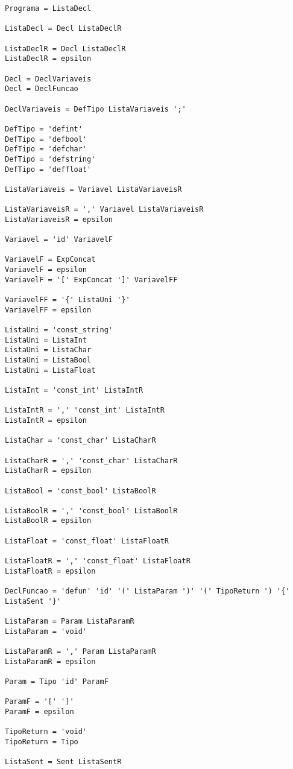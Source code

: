 \documentclass[
  12pt,				%
  oneside,			%
  a4paper,			%
  english,			%
  french,				%
  spanish,			%
  brazil,				%
]{abntex2}
\begin{document}
\begin{lstlisting}[label={code:gramatica-original},caption={Gramática
    original da linguagem de programação LisC.},style={mystyle}]
Programa = ListaDecl

ListaDecl = Decl ListaDeclR

ListaDeclR = Decl ListaDeclR
ListaDeclR = epsilon

Decl = DeclVariaveis
Decl = DeclFuncao

DeclVariaveis = DefTipo ListaVariaveis ';'

DefTipo = 'defint'
DefTipo = 'defbool'
DefTipo = 'defchar'
DefTipo = 'defstring'
DefTipo = 'deffloat'

ListaVariaveis = Variavel ListaVariaveisR

ListaVariaveisR = ',' Variavel ListaVariaveisR
ListaVariaveisR = epsilon

Variavel = 'id' VariavelF

VariavelF = ExpConcat
VariavelF = epsilon
VariavelF = '[' ExpConcat ']' VariavelFF

VariavelFF = '{' ListaUni '}'
VariavelFF = epsilon

ListaUni = 'const_string'
ListaUni = ListaInt
ListaUni = ListaChar
ListaUni = ListaBool
ListaUni = ListaFloat

ListaInt = 'const_int' ListaIntR

ListaIntR = ',' 'const_int' ListaIntR
ListaIntR = epsilon

ListaChar = 'const_char' ListaCharR

ListaCharR = ',' 'const_char' ListaCharR
ListaCharR = epsilon

ListaBool = 'const_bool' ListaBoolR

ListaBoolR = ',' 'const_bool' ListaBoolR
ListaBoolR = epsilon

ListaFloat = 'const_float' ListaFloatR

ListaFloatR = ',' 'const_float' ListaFloatR
ListaFloatR = epsilon

DeclFuncao = 'defun' 'id' '(' ListaParam ')' '(' TipoReturn ') '{' ListaSent '}'

ListaParam = Param ListaParamR
ListaParam = 'void'

ListaParamR = ',' Param ListaParamR
ListaParamR = epsilon

Param = Tipo 'id' ParamF

ParamF = '[' ']'
ParamF = epsilon

TipoReturn = 'void'
TipoReturn = Tipo

ListaSent = Sent ListaSentR


\end{lstlisting}
\end{document}
